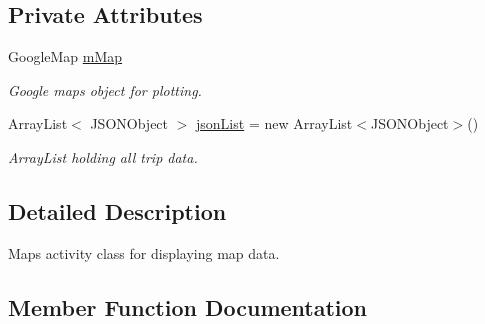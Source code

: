 \subsection*{Private Attributes}
\begin{DoxyCompactItemize}
\item 
\mbox{\label{classcom_1_1jack_1_1motorbikestatistics_1_1_maps_activity_aaace5219464acf3df9ac5e9ce913eef5}} 
Google\+Map \hyperlink{classcom_1_1jack_1_1motorbikestatistics_1_1_maps_activity_aaace5219464acf3df9ac5e9ce913eef5}{m\+Map}
\begin{DoxyCompactList}\small\item\em Google maps object for plotting. \end{DoxyCompactList}\item 
\mbox{\label{classcom_1_1jack_1_1motorbikestatistics_1_1_maps_activity_aaed26c36e08dad942830ab52d9d75d2e}} 
Array\+List$<$ J\+S\+O\+N\+Object $>$ \hyperlink{classcom_1_1jack_1_1motorbikestatistics_1_1_maps_activity_aaed26c36e08dad942830ab52d9d75d2e}{json\+List} = new Array\+List$<$J\+S\+O\+N\+Object$>$()
\begin{DoxyCompactList}\small\item\em Array\+List holding all trip data. \end{DoxyCompactList}\end{DoxyCompactItemize}


\subsection{Detailed Description}
Maps activity class for displaying map data. 

\subsection{Member Function Documentation}
\mbox{\label{classcom_1_1jack_1_1motorbikestatistics_1_1_maps_activity_afd23eb0cf651de276a9b85bb5fa609b8}} 
